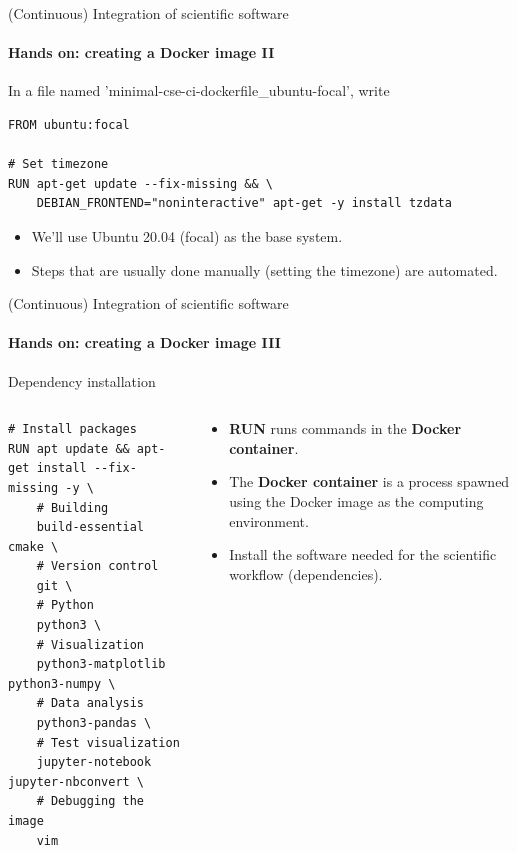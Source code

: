 \begin{frame}[fragile]{(Continuous) Integration of scientific software} 
    \framesubtitle{Hands on: creating a Docker image II} 
    \vfill

    In a file named 'minimal-cse-ci-dockerfile\_ubuntu-focal', write \\

    \begin{verbatim}
FROM ubuntu:focal 

# Set timezone
RUN apt-get update --fix-missing && \
    DEBIAN_FRONTEND="noninteractive" apt-get -y install tzdata
    \end{verbatim}

    \begin{itemize}
        \item We'll use Ubuntu 20.04 (focal) as the base system.
        \item Steps that are usually done manually (setting the timezone) are automated. 
    \end{itemize}

\end{frame}

\begin{frame}[fragile]{(Continuous) Integration of scientific software} 
    \framesubtitle{Hands on: creating a Docker image III} 
    \vfill

    Dependency installation 

    \begin{columns}
        \begin{column}[c]{0.5\textwidth}
    \begin{verbatim}
# Install packages
RUN apt update && apt-get install --fix-missing -y \
    # Building
    build-essential cmake \
    # Version control
    git \
    # Python
    python3 \ 
    # Visualization
    python3-matplotlib python3-numpy \
    # Data analysis
    python3-pandas \
    # Test visualization
    jupyter-notebook jupyter-nbconvert \
    # Debugging the image 
    vim  
    \end{verbatim}
        \end{column}
        \begin{column}[c]{0.5\textwidth}
            \begin{itemize}
                \item \textbf{RUN} runs commands in the \textbf{Docker container}. 
                \item The \textbf{Docker container} is a process spawned using the Docker image as the computing environment.
                \item Install the software needed for the scientific workflow (dependencies).
            \end{itemize}
        \end{column}
    \end{columns}


\end{frame}

